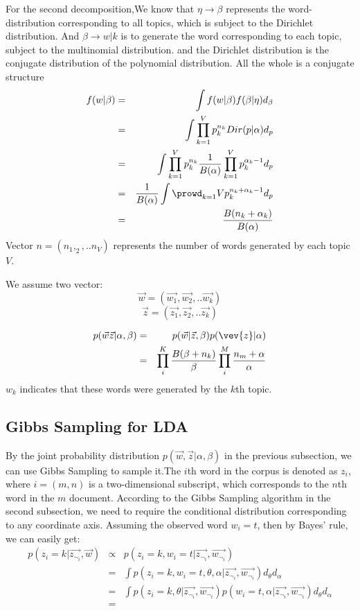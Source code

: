 For the second decomposition,We know that $\eta \rightarrow \beta$ represents the word-distribution corresponding to all topics, which is subject to the Dirichlet distribution. And $\beta  \rightarrow w|k $  is to generate the word corresponding to each topic, subject to the multinomial distribution. and the Dirichlet distribution is the conjugate distribution of the polynomial distribution. All the whole is a conjugate structure
\begin{eqnarray*}
  f(w|\beta) &=& \int f(w|\beta)f(\beta|\eta) d_{\beta} \\
              &=& \int \prod_{k=1}^V p_k^{n_k} Dir(p|\alpha) d_p \\
              &=& \int \prod_{k=1}^Vp_k^{n_k} \frac{1}{B(\alpha)}\prod_{k=1}^{V}p_k^{\alpha_k-1} d_p \\
              &=& \frac{1}{B(\alpha)}\int \prowd_{k=1}{V}p_k^{n_k+\alpha_k-1} d_p \\
              &=& \frac{B(n_k+\alpha_k)}{B(\alpha)}
\end{eqnarray*}
Vector $n = (n_1,_2,..n_V)$ represents the number of words generated by each topic $V$.

We assume two vector:
\[
  \vec{w} = (\vec{w_1},\vec{w_2},..\vec{w_k})
\]
\[
  \vec{z} = (\vec{z_1},\vec{z_2},..\vec{z_k})
\]


\begin{eqnarray*}
  p(\vec{w}\vec{z}|\alpha,\beta) & = & p(\vec{w}|\vec{z},\beta)p(\vev{z}|\alpha) \\
                                 & = & \prod_i^{K}\frac{B(\beta+n_k)}{\beta}\prod_i^M\frac{n_m+\alpha}{\alpha}
\end{eqnarray*}
$w_k$ indicates that these words were generated by the $k$th topic.

\subsection{Gibbs Sampling for LDA}
By the joint probability distribution $p(\vec{w},\vec{z}|\alpha,\beta)$ in the previous subsection, we can use Gibbs Sampling to sample it.The $i$th word in the corpus  is denoted as $z_{i}$, where $i=(m,n)$ is a two-dimensional subscript, which corresponds to the $n$th word in the $m$ document. According to the Gibbs Sampling algorithm in the second subsection, we need to require the conditional distribution corresponding to any coordinate axis. Assuming the observed word $w_i=t$, then by Bayes' rule, we can easily get:
\begin{eqnarray*}
  p(z_i=k|\vec{z_{\neg_i}},\vec{w}) & \propto & p(z_i=k,w_i = t|\vec{z_{\neg_i}},\vec{w_{\neg_i}}) \\
  &=& \int p(z_i = k,w_i=t,\theta,\alpha|\vec{z_{\neg_i}},\vec{w_{\neg_i}})d_{\theta} d_{\alpha} \\
  &=& \int p(z_i=k,\theta|\vec{z_{\neg_i}},\vec{w_{\neg_i}}) p(w_i=t,\alpha|\vec{z_{\neg_i}},\vec{w_{\neg_i}})d_{\theta} d_{\alpha}\\
  &=&
\end{eqnarray*}

